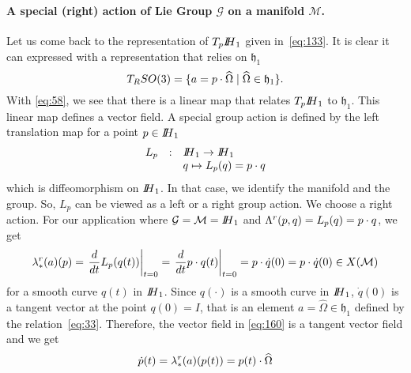 \paragraph{ A special  (right)  action of Lie Group $\mathcal G$ on a manifold $\mathcal M$. } 
Let us come back to the representation of  $T_p\mbox{\rm $I\!\!H$}_1$ given in~\eqref{eq:133}. It is clear it can expressed with a representation that relies on $\mathfrak h_1$
\begin{equation}
  \label{eq:158}
   T_RSO(3) = \{ a = p \cdot  \widehat \Omega \mid \widehat \Omega \in \mathfrak h_1 \}.
\end{equation}
With \eqref{eq:58}, we see that there is a linear map that relates $T_p\mbox{\rm $I\!\!H$}_1$ to  $\mathfrak h_1$. This linear map defines a vector field. 
A special group action is defined by the left translation map for a point $p \in \mbox{\rm $I\!\!H$}_1$ 
\begin{equation}
  \label{eq:159}
  \begin{array}[lcl]{rcl}
    L_p& :&   \HH_1 \rightarrow  \HH_1\\
       & &  q  \mapsto L_p(q) = p \glaw q\\
  \end{array}
\end{equation}
which is diffeomorphism on $\mbox{\rm $I\!\!H$}_1$. In that case, we identify the manifold and the group. So, $L_p$ can be viewed as a left or a right group action. We choose a right action. For our application where $\mathcal G = \mathcal M = \mbox{\rm $I\!\!H$}_1$ and $\Lambda^r(p,q) = L_{p}(q) =  p \cdot q $, we get
\begin{equation}
  \label{eq:160}
   \lambda^r_{*}(a)(p) = \left. \frac{d}{dt} L_{p}(q(t)) \right|_{t=0}  = \left. \frac{d}{dt} p \cdot q(t) \right|_{t=0} =  p \cdot \dot q(0) = p  \cdot \dot q(0)  \in X(\mathcal M)
 \end{equation}
 for a smooth curve $q(t)$ in $\mbox{\rm $I\!\!H$}_1$.
Since $q(\cdot)$ is a smooth curve in $\mbox{\rm $I\!\!H$}_1$, $\dot q(0)$ is a tangent vector at the point $q(0)=I$, that is an element $a = \widehat  \Omega  \in \mathfrak h_1 $ defined by the relation~\eqref{eq:33}. Therefore, the vector field in \eqref{eq:160} is a tangent vector field and we get
\begin{equation}
  \label{eq:161}
  \dot p(t) = \lambda^r_{*}(a)(p(t)) = p(t)  \cdot \widehat \Omega
\end{equation}

